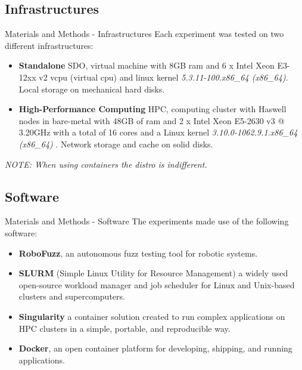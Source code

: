 \documentclass[aspectratio=169]{beamer}
\begin{document}
 \subsection{Infrastructures}
\begin{frame}{Materials and Methods - Infrastructures}
Each experiment was tested on two different infrastructures:
\begin{itemize}
    \item \textbf{Standalone} SDO,  virtual machine with 8GB ram and 6 x Intel Xeon E3-12xx v2 vcpu (virtual cpu) and linux kernel \textit{5.3.11-100.x86\_64 (x86\_64)}. Local storage on mechanical hard disks.
  
    \item \textbf{High-Performance Computing} HPC, computing cluster with Haswell nodes in bare-metal with 48GB of ram and 2 x Intel Xeon E5-2630 v3 @ 3.20GHz with a total of 16 cores and a Linux kernel \textit{3.10.0-1062.9.1.x86\_64 (x86\_64) } .
      Network storage and cache on solid disks. %
      
\end{itemize}
\textit{NOTE: When using containers the distro is indifferent.}
\end{frame}
 
 \subsection{Software}
\begin{frame}{Materials and Methods - Software}
The experiments made use of the following software:

\begin{itemize}
    \item \textbf{RoboFuzz}, an autonomous fuzz testing tool for robotic systems. 
    \item \textbf{SLURM} (Simple Linux Utility for Resource Management) a widely used open-source workload manager and job scheduler for Linux and Unix-based clusters and supercomputers.
    \item \textbf{Singularity} a container solution created to run complex applications on HPC clusters in a simple, portable, and reproducible way.
    \item \textbf{Docker}, an open container platform for developing, shipping, and running applications.
\end{itemize}

\end{frame}
\end{document}
